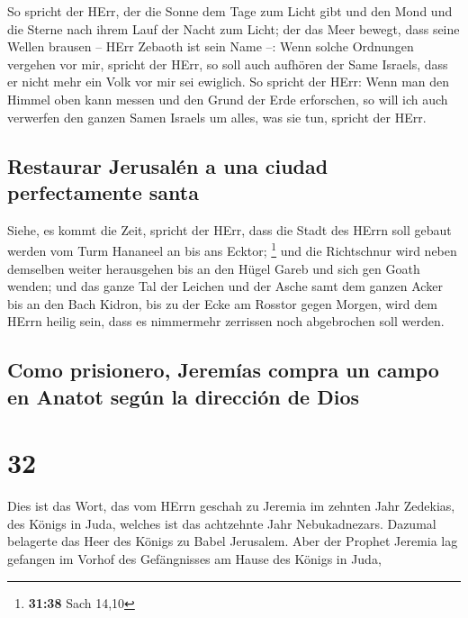  So spricht der HErr, der die Sonne dem Tage zum Licht
gibt und den Mond und die Sterne nach ihrem Lauf der Nacht zum Licht;
der das Meer bewegt, dass seine Wellen brausen -- HErr Zebaoth ist sein
Name --:  Wenn solche Ordnungen vergehen vor mir, spricht
der HErr, so soll auch aufhören der Same Israels, dass er nicht mehr ein
Volk vor mir sei ewiglich.  So spricht der HErr: Wenn man
den Himmel oben kann messen und den Grund der Erde erforschen, so will
ich auch verwerfen den ganzen Samen Israels um alles, was sie tun,
spricht der HErr.

\hypertarget{restaurar-jerusaluxe9n-a-una-ciudad-perfectamente-santa}{%
\subsection{Restaurar Jerusalén a una ciudad perfectamente
santa}\label{restaurar-jerusaluxe9n-a-una-ciudad-perfectamente-santa}}

 Siehe, es kommt die Zeit, spricht der HErr, dass die
Stadt des HErrn soll gebaut werden vom Turm Hananeel an bis ans Ecktor;
\footnote{\textbf{31:38} Sach 14,10}  und die Richtschnur
wird neben demselben weiter herausgehen bis an den Hügel Gareb und sich
gen Goath wenden;  und das ganze Tal der Leichen und der
Asche samt dem ganzen Acker bis an den Bach Kidron, bis zu der Ecke am
Rosstor gegen Morgen, wird dem HErrn heilig sein, dass es nimmermehr
zerrissen noch abgebrochen soll werden.

\hypertarget{como-prisionero-jeremuxedas-compra-un-campo-en-anatot-seguxfan-la-direcciuxf3n-de-dios}{%
\subsection{Como prisionero, Jeremías compra un campo en Anatot según la
dirección de
Dios}\label{como-prisionero-jeremuxedas-compra-un-campo-en-anatot-seguxfan-la-direcciuxf3n-de-dios}}

\hypertarget{section-31}{%
\section{32}\label{section-31}}

 Dies ist das Wort, das vom HErrn geschah zu Jeremia im
zehnten Jahr Zedekias, des Königs in Juda, welches ist das achtzehnte
Jahr Nebukadnezars.  Dazumal belagerte das Heer des Königs
zu Babel Jerusalem. Aber der Prophet Jeremia lag gefangen im Vorhof des
Gefängnisses am Hause des Königs in Juda,

